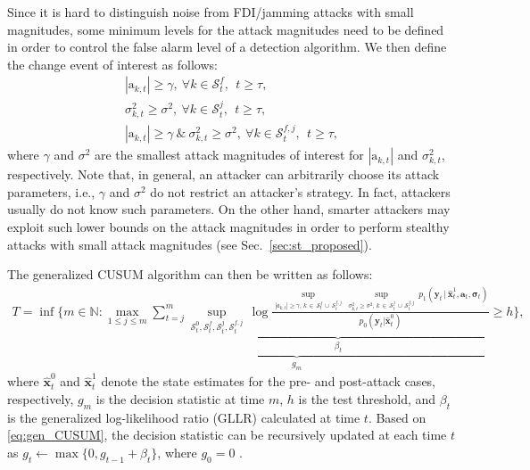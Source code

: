\documentclass[onecolumn]{IEEEtran}
\def\inf{\mathop{\mathrm{inf}}}
\begin{document}
Since it is hard to distinguish noise from FDI/jamming attacks with small magnitudes, some minimum levels for the attack magnitudes need to be defined in order to control the false alarm level of a detection algorithm. We then define the change event of interest as follows:
\begin{gather} \nonumber
 |\mathrm{a}_{k,t}| \geq \gamma,~ \forall k \in \mathcal{S}_t^f, ~~ t \geq \tau, \\ \nonumber
 \sigma_{k,t}^2 \geq \sigma^2,~ \forall k \in \mathcal{S}_t^j, ~~ t \geq \tau, \\ \label{eq:change_event}
 |\mathrm{a}_{k,t}| \geq \gamma ~ \& ~ \sigma_{k,t}^2 \geq \sigma^2, ~ \forall k \in \mathcal{S}_t^{f,j}, ~~ t \geq \tau,
\end{gather}
where $\gamma$ and $\sigma^2$ are the smallest attack magnitudes of interest for $|\mathrm{a}_{k,t}|$ and $\sigma_{k,t}^2$, respectively. Note that, in general, an attacker can arbitrarily choose its attack parameters, i.e., $\gamma$ and $\sigma^2$ do not restrict an attacker's strategy. In fact, attackers usually do not know such parameters. On the other hand, smarter attackers may exploit such lower bounds on the attack magnitudes in order to perform stealthy attacks with small attack magnitudes (see Sec.~\ref{sec:st_proposed}).

The generalized CUSUM algorithm can then be written as follows:
\begin{gather} \label{eq:gen_CUSUM}
T = \inf \bigg\{m \in \mathbb{N}: \underbrace{ \max_{1 \leq j \leq m} \sum_{t=j}^{m} \underbrace{ \sup_{\mathcal{S}_t^0,\mathcal{S}_t^f,\mathcal{S}_t^j,\mathcal{S}_t^{f,j}} \, \log {\frac{\sup_{|a_{k,t}| \geq \gamma, \, k \, \in \, \mathcal{S}_t^f \, \cup \, \mathcal{S}_t^{f,j}} \, \sup_{\sigma_{k,t}^2 \geq \sigma^2, \, k \, \in \, \mathcal{S}_t^j \, \cup \, \mathcal{S}_t^{f,j}} \, p_1(\mathbf{y}_t \,|\, \hat{\mathbf{x}}_t^1, \mathbf{a}_t, \pmb{\sigma}_t) }{p_0(\mathbf{y}_t|\hat{\mathbf{x}}_t^0)}}}_{\beta_t}}_{g_m} \geq h \bigg\},
\end{gather}
where $\hat{\mathbf{x}}_t^0$ and $\hat{\mathbf{x}}_t^1$ denote the state estimates for the pre- and post-attack cases, respectively, $g_m$ is the decision statistic at time $m$, $h$ is the test threshold, and $\beta_t$ is the generalized log-likelihood ratio (GLLR) calculated at time $t$. Based on \eqref{eq:gen_CUSUM}, the decision statistic can be recursively updated at each time $t$ as $g_t \gets \max\{0, g_{t-1} + \beta_t\}$, where $g_0 = 0$ \cite[Sec. 2.2]{Basseville93}.
\end{document}
